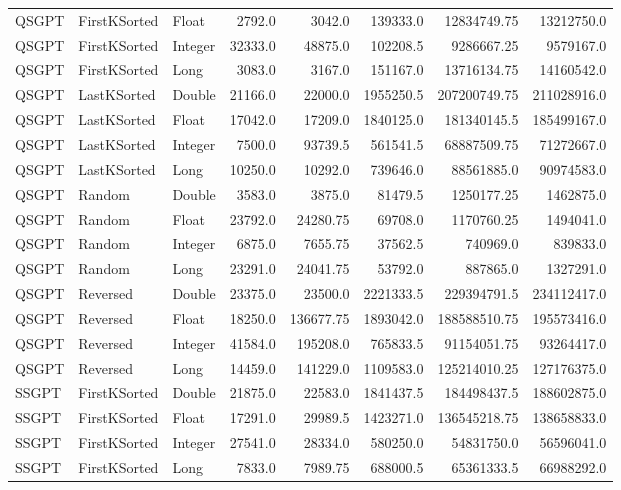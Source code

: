 \documentclass[unicode,11pt,a4paper,oneside,numbers=endperiod,openany]{scrartcl}
\begin{document}
\begin{center}
\begin{longtable}{|l|l|l|r|r|r|r|r|}
            QSGPT & FirstKSorted & Float & 2792.0 & 3042.0 & 139333.0 & 12834749.75 & 13212750.0 \\
            QSGPT & FirstKSorted & Integer & 32333.0 & 48875.0 & 102208.5 & 9286667.25 & 9579167.0 \\
            QSGPT & FirstKSorted & Long & 3083.0 & 3167.0 & 151167.0 & 13716134.75 & 14160542.0 \\
            QSGPT & LastKSorted & Double & 21166.0 & 22000.0 & 1955250.5 & 207200749.75 & 211028916.0 \\
            QSGPT & LastKSorted & Float & 17042.0 & 17209.0 & 1840125.0 & 181340145.5 & 185499167.0 \\
            QSGPT & LastKSorted & Integer & 7500.0 & 93739.5 & 561541.5 & 68887509.75 & 71272667.0 \\
            QSGPT & LastKSorted & Long & 10250.0 & 10292.0 & 739646.0 & 88561885.0 & 90974583.0 \\
            QSGPT & Random & Double & 3583.0 & 3875.0 & 81479.5 & 1250177.25 & 1462875.0 \\
            QSGPT & Random & Float & 23792.0 & 24280.75 & 69708.0 & 1170760.25 & 1494041.0 \\
            QSGPT & Random & Integer & 6875.0 & 7655.75 & 37562.5 & 740969.0 & 839833.0 \\
            QSGPT & Random & Long & 23291.0 & 24041.75 & 53792.0 & 887865.0 & 1327291.0 \\
            QSGPT & Reversed & Double & 23375.0 & 23500.0 & 2221333.5 & 229394791.5 & 234112417.0 \\
            QSGPT & Reversed & Float & 18250.0 & 136677.75 & 1893042.0 & 188588510.75 & 195573416.0 \\
            QSGPT & Reversed & Integer & 41584.0 & 195208.0 & 765833.5 & 91154051.75 & 93264417.0 \\
            QSGPT & Reversed & Long & 14459.0 & 141229.0 & 1109583.0 & 125214010.25 & 127176375.0 \\
            SSGPT & FirstKSorted & Double & 21875.0 & 22583.0 & 1841437.5 & 184498437.5 & 188602875.0 \\
            SSGPT & FirstKSorted & Float & 17291.0 & 29989.5 & 1423271.0 & 136545218.75 & 138658833.0 \\
            SSGPT & FirstKSorted & Integer & 27541.0 & 28334.0 & 580250.0 & 54831750.0 & 56596041.0 \\
            SSGPT & FirstKSorted & Long & 7833.0 & 7989.75 & 688000.5 & 65361333.5 & 66988292.0 \\

\end{longtable}
\end{center}
\end{document}
